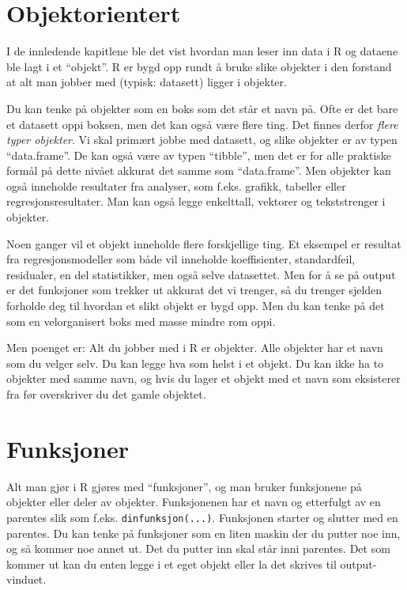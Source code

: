 \documentclass[
  letterpaper,
  DIV=11,
  numbers=noendperiod]{scrreprt}
\theoremstyle{definition}
\theoremstyle{remark}
\begin{document}
\hypertarget{objektorientert}{%
\section{Objektorientert}\label{objektorientert}}

I de innledende kapitlene ble det vist hvordan man leser inn data i R og
dataene ble lagt i et ``objekt''. R er bygd opp rundt å bruke slike
objekter i den forstand at alt man jobber med (typisk: datasett) ligger
i objekter.

Du kan tenke på objekter som en boks som det står et navn på. Ofte er
det bare et datasett oppi boksen, men det kan også være flere ting. Det
finnes derfor \emph{flere typer objekter}. Vi skal primært jobbe med
datasett, og slike objekter er av typen ``data.frame''. De kan også være
av typen ``tibble'', men det er for alle praktiske formål på dette
nivået akkurat det samme som ``data.frame''. Men objekter kan også
inneholde resultater fra analyser, som f.eks. grafikk, tabeller eller
regresjonsresultater. Man kan også legge enkelttall, vektorer og
tekststrenger i objekter.

Noen ganger vil et objekt inneholde flere forskjellige ting. Et eksempel
er resultat fra regresjonsmodeller som både vil inneholde koeffisienter,
standardfeil, residualer, en del statistikker, men også selve
datasettet. Men for å se på output er det funksjoner som trekker ut
akkurat det vi trenger, så du trenger sjelden forholde deg til hvordan
et slikt objekt er bygd opp. Men du kan tenke på det som en
velorganisert boks med masse mindre rom oppi.

Men poenget er: Alt du jobber med i R er objekter. Alle objekter har et
navn som du velger selv. Du kan legge hva som helst i et objekt. Du kan
ikke ha to objekter med samme navn, og hvis du lager et objekt med et
navn som eksisterer fra før overskriver du det gamle objektet.

\hypertarget{funksjoner}{%
\section{Funksjoner}\label{funksjoner}}

Alt man gjør i R gjøres med ``funksjoner'', og man bruker funksjonene på
objekter eller deler av objekter. Funksjonenen har et navn og etterfulgt
av en parentes slik som f.eks. \texttt{dinfunksjon(...)}. Funksjonen
starter og slutter med en parentes. Du kan tenke på funksjoner som en
liten maskin der du putter noe inn, og så kommer noe annet ut. Det du
putter inn skal står inni parentes. Det som kommer ut kan du enten legge
i et eget objekt eller la det skrives til output-vinduet.
\end{document}
